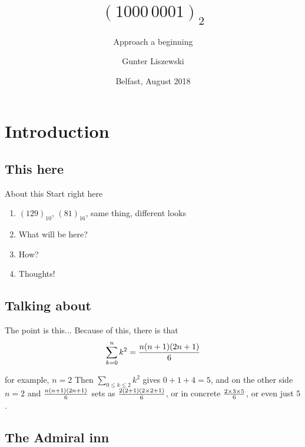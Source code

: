 \documentclass[pdf]{beamer}
\title{$(1000\, 0001)_2$}
\subtitle{Approach a beginning}
\author[Gunter Liszewski\\ \copyright 2018]{Gunter Liszewski}
\date{Belfast, August 2018}
\begin{document}
\begin{frame}
  \titlepage
\end{frame}


\section{Introduction}
\subsection{This here}

\begin{frame}{About this}
  Start right here
  \begin{enumerate}[A]
    \pause
    \item{} $(129)_{10}$, $(81)_{16}$, same thing, different looks
    \pause
    \item{} What will be here?
    \pause
    \item{} How?
    \pause
    \item{} Thoughts!
  \end{enumerate}
\end{frame}
\subsection{Talking about}

\begin{frame}{The point is this...}
  Because of this, there is that
$$\sum_{k=0}^{n}{k^2}={n(n+1)(2n+1)\over 6}$$
\end{frame}


\begin{frame}{for example, $n=2$}
  Then $\sum_{0\le k\le2}k^2$ gives $0+1+4=5$, and on the other side $n=2$ and ${n(n+1)(2n+1)\over 6}$
sets as ${2(2+1)(2\times2+1)\over 6}$, or in concrete $2\times3\times5\over6$, or even just $5$.
\end{frame}

\subsection{The Admiral inn}
\end{document}
